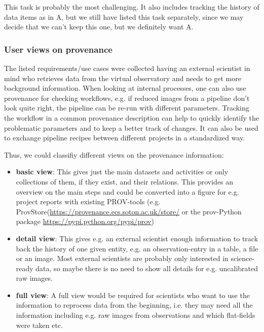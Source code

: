 \documentclass[11pt,a4paper]{ivoa}
\begin{document}
        This task is probably the most challenging. It also includes tracking the history of data items as in A, but we still have listed this task separately, since we may decide that we can't keep this one, but we definitely want A.

\subsubsection{User views on provenance}\label{sec:userviews}

The listed requirements/use cases were collected having an external scientist in mind who retrieves data from the virtual observatory and needs to get more background information. When looking at internal processes, one can also use provenance for checking workflows, e.g. if reduced images from a pipeline don't look quite right, the pipeline can be re-run with different parameters. Tracking the workflow in a common provenance description can help to quickly identify the problematic parameters and to keep a better track of changes. It can also be used to exchange pipeline recipes between different projects in a standardized way.

Thus, we could classifiy different views on the provenance information:
\begin{itemize}
\item \textbf{basic view}: This gives just the main datasets and activities or only collections of them, if they exist, and their relations. This provides an overview on the main steps and could be converted into a figure for e.g. project reports with existing PROV-tools (e.g. ProvStore(\url{https://provenance.ecs.soton.ac.uk/store/} or the prov-Python package \url{https://pypi.python.org/pypi/prov})  

\item \textbf{detail view}: This gives e.g. an external scientist enough information to track back the history of one given entity, e.g. an observation-entry in a table, a file or an image. Most external scientists are probably only interested in science-ready data, so maybe there is no need to show all details for e.g. uncalibrated raw images.

\item \textbf{full view}: A full view would be required for scientists who want to use the information to reprocess data from the beginning, i.e. they may need all the information including e.g. raw images from observations and which flat-fields were taken etc.
\end{itemize}
\end{document}
